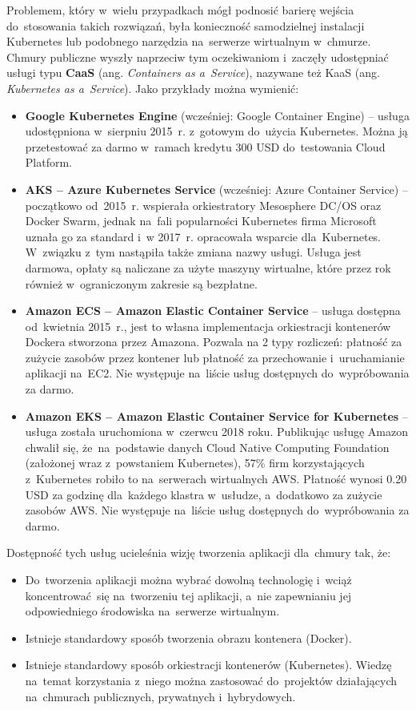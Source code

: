 \documentclass[12pt,a4paper,twoside,titlepage,openright]{book}
\begin{document}
Problemem, który w~wielu przypadkach mógł podnosić barierę wejścia do~stosowania takich rozwiązań, była konieczność samodzielnej instalacji Kubernetes lub podobnego narzędzia na~serwerze wirtualnym w~chmurze. Chmury publiczne wyszły naprzeciw tym oczekiwaniom i~zaczęły udostępniać usługi typu \textbf{CaaS} (ang. \textit{Containers as a~Service}), nazywane też KaaS (ang. \textit{Kubernetes as a~Service}). Jako przykłady można wymienić:
\begin{itemize}
\item \textbf{Google Kubernetes Engine} (wcześniej: Google Container Engine) -- usługa udostępniona w~sierpniu 2015~r. \cite{siteGoogleBlogKubernetes} z~gotowym do~użycia Kubernetes. Można ją przetestować za darmo w~ramach kredytu 300 USD do~testowania Cloud Platform.\cite{siteGoogleTry}
\item \textbf{AKS -- Azure Kubernetes Service} (wcześniej: Azure Container Service) -- początkowo od~2015~r. wspierała orkiestratory Mesosphere DC/OS oraz Docker Swarm, jednak na~fali popularności Kubernetes firma Microsoft uznała go za standard i~w 2017~r. opracowała wsparcie dla~Kubernetes. W~związku z~tym nastąpiła także zmiana nazwy usługi. \cite{siteMicrosoftBlogAks} Usługa jest darmowa\cite{siteAksPricing}, opłaty są naliczane za użyte maszyny wirtualne, które przez rok również w~ograniczonym zakresie są bezpłatne.\cite{siteAzureTry}
\item \textbf{Amazon ECS -- Amazon Elastic Container Service} -- usługa dostępna od~kwietnia 2015~r., jest to własna implementacja orkiestracji kontenerów Dockera stworzona przez Amazona. Pozwala na 2 typy rozliczeń: płatność za zużycie zasobów przez kontener lub płatność za przechowanie i~uruchamianie aplikacji na~EC2.\cite{siteAmazonEcsPricing} Nie występuje na~liście usług dostępnych do~wypróbowania za darmo.\cite{siteAmazonTry}
\item \textbf{Amazon EKS -- Amazon Elastic Container Service for Kubernetes} -- usługa została uruchomiona w~czerwcu 2018 roku. Publikując usługę Amazon chwalił się, że~na~podstawie danych Cloud Native Computing Foundation (założonej wraz z~powstaniem Kubernetes), 57\% firm korzystających z~Kubernetes robiło to na~serwerach wirtualnych AWS. Płatność wynosi 0.20 USD za godzinę dla~każdego klastra w~usłudze, a~dodatkowo za zużycie zasobów AWS.\cite{siteAmazonEksPricing} Nie występuje na~liście usług dostępnych do~wypróbowania za darmo.\cite{siteAmazonTry}
\end{itemize}

Dostępność tych usług ucieleśnia wizję tworzenia aplikacji dla~chmury tak, że:
\begin{itemize}
\item Do~tworzenia aplikacji można wybrać dowolną technologię i~wciąż koncentrować~się na~tworzeniu tej aplikacji, a~nie zapewnianiu jej odpowiedniego środowiska na~serwerze wirtualnym.
\item Istnieje standardowy sposób tworzenia obrazu kontenera (Docker).
\item Istnieje standardowy sposób orkiestracji kontenerów (Kubernetes). Wiedzę na~temat korzystania z~niego można zastosować do~projektów działających na~chmurach publicznych, prywatnych i~hybrydowych.
\end{itemize}
\end{document}
